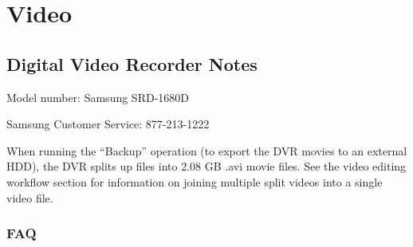 \documentclass[11pt,oneside]{book}
\begin{document}
\mainmatter

\chapter{Video}
\label{chap:Video}

\section{Digital Video Recorder Notes}

Model number: Samsung SRD-1680D

Samsung Customer Service: 877-213-1222

When running the ``Backup'' operation (to export the DVR movies to an external HDD), the DVR splits up files into 2.08 GB .avi movie files. See the video editing workflow section for information on joining multiple split videos into a single video file.

\subsection*{FAQ}
\end{document}
